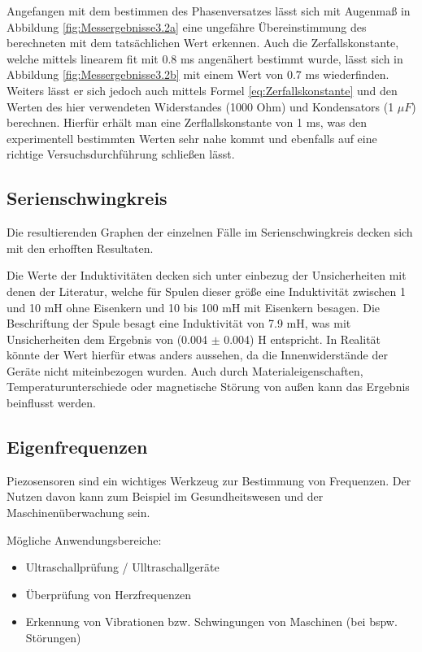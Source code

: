 \documentclass[12pt,a4paper,twoside]{article}
\begin{document}
Angefangen mit dem bestimmen des Phasenversatzes lässt sich mit Augenmaß in Abbildung \ref{fig:Messergebnisse3.2a} eine ungefähre Übereinstimmung des berechneten mit dem tatsächlichen Wert erkennen.
Auch die Zerfallskonstante, welche mittels linearem fit mit 0.8 ms angenähert bestimmt wurde, lässt sich in Abbildung \ref{fig:Messergebnisse3.2b} mit einem Wert von 0.7 ms wiederfinden. Weiters lässt er sich jedoch auch mittels Formel \ref{eq:Zerfallskonstante} und den Werten des hier verwendeten Widerstandes (1000 Ohm) und Kondensators (1 $\mu F$) berechnen. Hierfür erhält man eine Zerflallskonstante von 1 ms, was den experimentell bestimmten Werten sehr nahe kommt und ebenfalls auf eine richtige Versuchsdurchführung schließen lässt.


\subsection{Serienschwingkreis}

Die resultierenden Graphen der einzelnen Fälle im Serienschwingkreis decken sich mit den erhofften Resultaten. \newline

\noindent
Die Werte der Induktivitäten decken sich unter einbezug der Unsicherheiten mit denen der Literatur, welche für Spulen dieser größe eine Induktivität zwischen 1 und 10 mH ohne Eisenkern und 10 bis 100 mH mit Eisenkern besagen. Die Beschriftung der Spule besagt eine Induktivität von 7.9 mH, was mit Unsicherheiten dem Ergebnis von (0.004 $\pm$ 0.004) H entspricht. 
In Realität könnte der Wert hierfür etwas anders aussehen, da die Innenwiderstände der Geräte nicht miteinbezogen wurden. Auch durch Materialeigenschaften, Temperaturunterschiede oder magnetische Störung von außen kann das Ergebnis beinflusst werden. 


\subsection{Eigenfrequenzen}

Piezosensoren sind ein wichtiges Werkzeug zur Bestimmung von Frequenzen. Der Nutzen davon kann zum Beispiel im Gesundheitswesen und der Maschinenüberwachung sein. \newline

\noindent
Mögliche Anwendungsbereiche:

\begin{itemize}
    \item Ultraschallprüfung / Ulltraschallgeräte
    \item Überprüfung von Herzfrequenzen 
    \item Erkennung von Vibrationen bzw. Schwingungen von Maschinen (bei bspw. Störungen)
\end{itemize}
\end{document}
